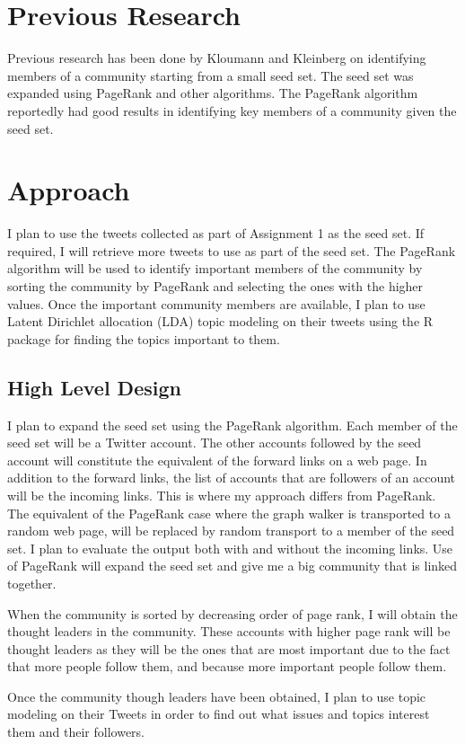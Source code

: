 \documentclass{sig-alternate-05-2015}
\begin{document}
\section{Previous Research}

Previous research has been done by Kloumann and Kleinberg \cite{SeedSet} on identifying members of a community starting from a small seed set. The seed set was expanded using PageRank and other algorithms. The PageRank algorithm reportedly had good results in identifying key members of a community given the seed set.
\section{Approach}
I plan to use the tweets collected as part of Assignment 1 as the seed set. If required, I will retrieve more tweets to use as part of the seed set. The PageRank algorithm will be used to identify important members of the community by sorting the community by PageRank and selecting the ones with the higher values. Once the important community members are available, I plan to use Latent Dirichlet allocation (LDA) topic modeling on their tweets using the R package for finding the topics important to them.

\subsection{High Level Design}
I plan to expand the seed set using the PageRank algorithm. Each member of the seed set will be a Twitter account. The other accounts followed by the seed account will constitute the equivalent of the forward links on a web page. In addition to the forward links, the list of accounts that are followers of an account will be the incoming links. This is where my approach differs from PageRank. The equivalent of the PageRank case where the graph walker is transported to a random web page, will be replaced by random transport to a member of the seed set. I plan to evaluate the output both with and without the incoming links. Use of PageRank will expand the seed set and give me a big community that is linked together. 

When the community is sorted by decreasing order of page rank, I will obtain the thought leaders in the community. These accounts with higher page rank will be thought leaders as they will be the ones that are most important due to the fact that more people follow them, and because more important people follow them.

Once the community though leaders have been obtained, I plan to use topic modeling on their Tweets in order to find out what issues and topics interest them and their followers.
\end{document}
